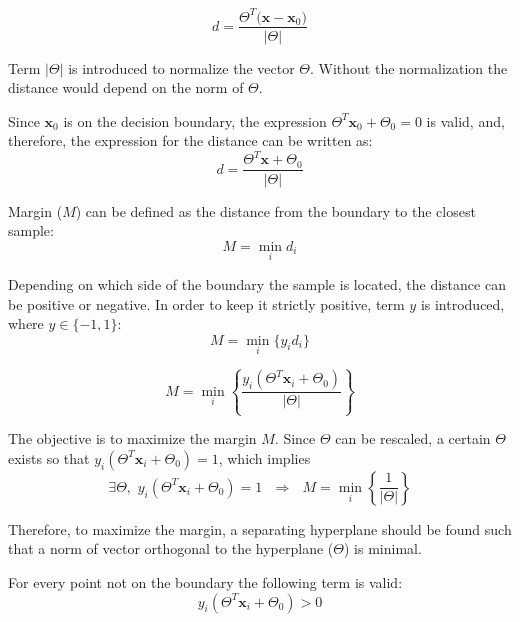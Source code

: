\begin{equation} 
d = \frac{\Theta^T \big(\mathbf{x} - \mathbf{x}_0\big)}{\big\vert \Theta \big\vert}
\end{equation}

\noindent Term $\vert \Theta \vert$ is introduced to normalize the vector $\Theta$. Without the normalization the distance would depend on the norm of $\Theta$.

Since $\mathbf{x}_0$ is on the decision boundary, the expression $\Theta^T \mathbf{x}_0 + \Theta_0 = 0$ is valid, and, therefore, the expression for the distance can be written as:
\begin{equation} 
d = \frac{\Theta^T \mathbf{x} + \Theta_0}{\big\vert \Theta \big\vert}
\end{equation}

Margin ($M$) can be defined as the distance from the boundary to the closest sample:
\begin{equation} 
M = \min_i d_i
\end{equation}

Depending on which side of the boundary the sample is located, the distance can be positive or negative. In order to keep it strictly positive, term $y$ is introduced, where $y \in \{-1,1\}$:
\begin{equation} 
M = \min_i \big\{y_id_i\big\}
\end{equation}

\begin{equation} 
M = \min_i \left\{ \frac{y_i \left(\Theta^T \mathbf{x}_i + \Theta_0\right)}{\left\vert \Theta \right\vert} \right\}
\end{equation}

The objective is to maximize the margin $M$. Since $\Theta$ can be rescaled, a certain $\Theta$ exists so that $y_i \left(\Theta^T \mathbf{x}_i + \Theta_0\right) = 1$, which implies
\begin{equation} 
\exists \Theta, \,\, y_i \left(\Theta^T \mathbf{x}_i + \Theta_0\right) = 1 \,\,\,\, \Rightarrow \,\,\,\, M = \min_i \left\{ \frac{1}{\left\vert \Theta \right\vert} \right\}
\end{equation}

\noindent Therefore, to maximize the margin, a separating hyperplane should be found such that a norm of vector orthogonal to the hyperplane ($\Theta$) is minimal. 

For every point not on the boundary the following term is valid:
\begin{equation} 
y_i \left(\Theta^T \mathbf{x}_i + \Theta_0\right) > 0 
\end{equation}

